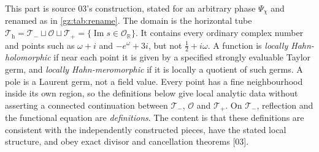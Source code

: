 \documentclass[11pt,a4paper]{article}
\numberwithin{equation}{section}
\theoremstyle{definition}
\theoremstyle{remark}
\newcommand{\R}{\mathbb R}
\newcommand{\OO}{\mathcal O}
\renewcommand{\Im}{\operatorname{Im}}
\newcommand{\Tp}{\mathcal T_{+}}
\newcommand{\Tm}{\mathcal T_{-}}
\newcommand{\Th}{\mathcal T_{\mathrm h}}
\newcommand{\src}[1]{\textup{[#1]}}
\begin{document}
This part is source 03's construction, stated for an arbitrary phase
$\Psi_\chi$ and renamed as in \cref{gz:tab:rename}. The domain is the
horizontal tube $\Th=\Tm\sqcup\OO\sqcup\Tp=\{\Im s\in\OO_\R\}$. It contains
every ordinary complex number and points such as $\omega+i$ and
$-e^\omega+3i$, but not $\tfrac12+i\omega$. A function is \emph{locally
Hahn-holomorphic} if near each point it is given by a specified strongly
evaluable Taylor germ, and \emph{locally Hahn-meromorphic} if it is locally
a quotient of such germs. A pole is a Laurent germ, not a field value. Every
point has a fine neighbourhood inside its own region, so the definitions
below give local analytic data without asserting a connected continuation
between $\Tm$, $\OO$ and $\Tp$. On $\Tm$, reflection and the functional
equation are \emph{definitions}. The content is that these definitions are
consistent with the independently constructed pieces, have the stated local
structure, and obey exact divisor and cancellation theorems \src{03}.
\end{document}
